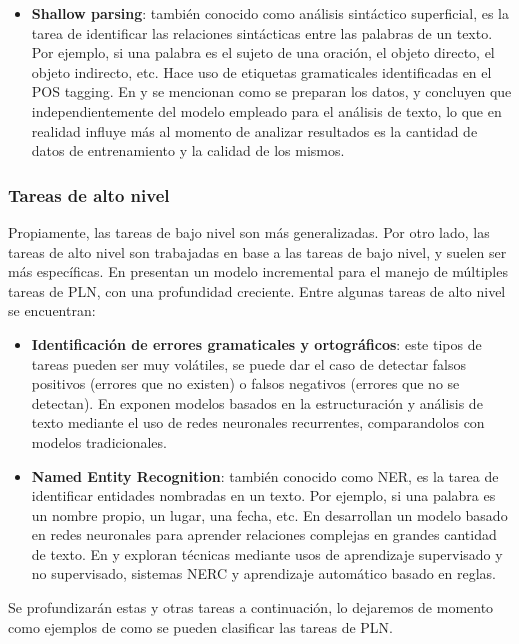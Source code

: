 \documentclass[12pt, conference]{IEEEtran}
\begin{document}
\begin{itemize}
  \item \textbf{Shallow parsing}: también conocido como análisis sintáctico superficial, es la tarea de identificar las relaciones sintácticas entre las palabras de un texto. Por ejemplo, si una palabra es el sujeto de una oración, el objeto directo, el objeto indirecto, etc. Hace uso de etiquetas gramaticales identificadas en el POS tagging. En \cite{b10} y \cite{b11} se mencionan como se preparan los datos, y concluyen que independientemente del modelo empleado para el análisis de texto, lo que en realidad influye más al momento de analizar resultados es la cantidad de datos de entrenamiento y la calidad de los mismos.
\end{itemize}

\subsubsection{Tareas de alto nivel}
Propiamente, las tareas de bajo nivel son más generalizadas. Por otro lado, las tareas de alto nivel son trabajadas en base a las tareas de bajo nivel, y suelen ser más específicas. En \cite{b12} presentan un modelo incremental para el manejo de múltiples tareas de PLN, con una profundidad creciente. Entre algunas tareas de alto nivel se encuentran:
\begin{itemize}
  \item \textbf{Identificación de errores gramaticales y ortográficos}: este tipos de tareas pueden ser muy volátiles, se puede dar el caso de detectar falsos positivos (errores que no existen) o falsos negativos (errores que no se detectan).  En \cite{b13} \cite{b14} exponen modelos basados en la estructuración y análisis de texto mediante el uso de redes neuronales recurrentes, comparandolos con modelos tradicionales.
  \item \textbf{Named Entity Recognition}: también conocido como NER, es la tarea de identificar entidades nombradas en un texto. Por ejemplo, si una palabra es un nombre propio, un lugar, una fecha, etc. En \cite{b15} desarrollan un modelo basado en redes neuronales para aprender relaciones complejas en grandes cantidad de texto. En \cite{b16} y \cite{b17} exploran técnicas mediante usos de aprendizaje supervisado y no supervisado, sistemas NERC y aprendizaje automático basado en reglas.
\end{itemize}
Se profundizarán estas y otras tareas a continuación, lo dejaremos de momento como ejemplos de como se pueden clasificar las tareas de PLN.
\end{document}
